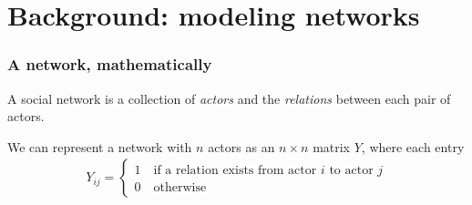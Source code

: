 \documentclass[ 10pt]{beamer}
\begin{document}
\section{Background: modeling networks}
\frame
{
\frametitle{A network, mathematically}

A social network is a collection of \emph{actors} and the \emph{relations} between each pair of actors.  

We can represent a network with $n$ actors as an $n \times n$ matrix $Y$, where each entry
\begin{align*}
	Y_{ij} =
	\begin{cases} 	1 \quad \text{if a relation exists from actor $i$ to actor $j$}\\
					0 \quad \text{otherwise}
	\end{cases}
\end{align*}
\pause

}
\end{document}
